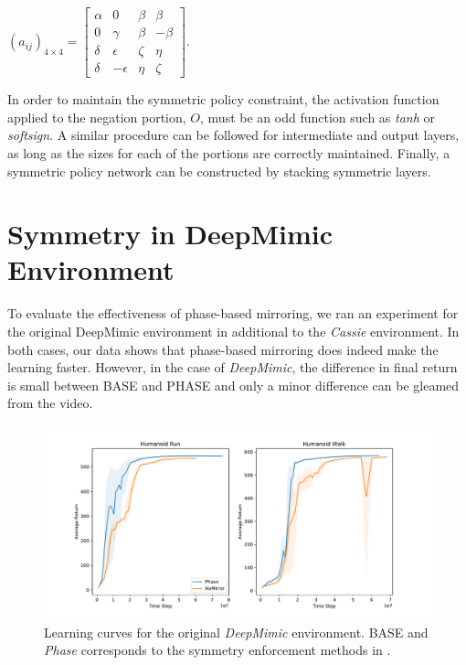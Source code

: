 \begin{center}
$(a_{ij})_{4\times4} = \begin{bmatrix} 
\alpha &  0 & \beta & \beta \\ 
0 & \gamma & \beta & -\beta \\
\delta &  \epsilon & \zeta & \eta \\
\delta & -\epsilon & \eta & \zeta
\end{bmatrix}$.
\end{center}

In order to maintain the symmetric policy constraint, the activation function applied to the negation portion, $O$, must be an odd function such as \textit{tanh} or \textit{softsign}.  A similar procedure can be followed for intermediate and output layers, as long as the sizes for each of the portions are correctly maintained.  Finally, a symmetric policy network can be constructed by stacking symmetric layers.

\section{Symmetry in DeepMimic Environment}
\label{sec:deepmimic-results}

To evaluate the effectiveness of phase-based mirroring, we ran an experiment for the original DeepMimic environment \citep{2018-TOG-deepMimic} in additional to the \textit{Cassie} environment.  In both cases, our data shows that phase-based mirroring does indeed make the learning faster.  However, in the case of \textit{DeepMimic}, the difference in final return is small between BASE and PHASE and only a minor difference can be gleamed from the video.

\begin{figure}
  \centering
  \includegraphics[width=0.9\columnwidth]{symmetry_figures/DeepMimic_curves.pdf}
  \caption{Learning curves for the original \textit{DeepMimic} environment. BASE and \textit{Phase} corresponds to the symmetry enforcement methods in .}
  \label{fig:deepmimic-curves}
\end{figure}